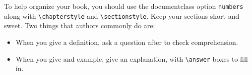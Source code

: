 \documentclass{ximera}
\begin{document}
To help organize your book, you should use the documentclass option \verb!numbers! along with  \texttt{\textbackslash chapterstyle} and 
\texttt{\textbackslash sectionstyle}. Keep your sections short and sweet. Two things that authors commonly do are:
\begin{itemize}
  \item When you give a definition, ask a question after to check comprehension. 
  \item When you give and example, give an explanation, with
        \texttt{\textbackslash answer} boxes to fill in.
\end{itemize}
\end{document}
